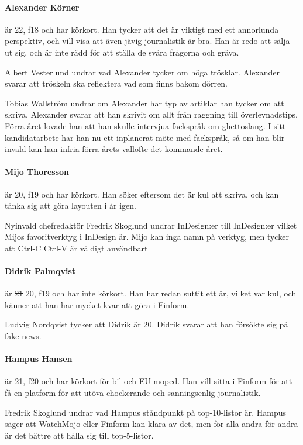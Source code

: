 \documentclass[hidelinks]{sektionsmote}
\begin{document}
\paragraph{Alexander Körner} är 22, f18 och har körkort.
Han tycker att det är viktigt med ett annorlunda perspektiv, och vill visa att även jävig journalistik är bra.
Han är redo att sälja ut sig, och är inte rädd för att ställa de svåra frågorna och gräva.

Albert Vesterlund undrar vad Alexander tycker om höga trösklar.
Alexander svarar att tröskeln ska reflektera vad som finns bakom dörren.

Tobias Wallström undrar om Alexander har typ av artiklar han tycker om att skriva.
Alexander svarar att han skrivit om allt från raggning till överlevnadstips.
Förra året lovade han att han skulle intervjua fackspråk om ghettoslang.
I sitt kandidatarbete har han nu ett inplanerat möte med fackspråk, så om han blir invald kan han infria förra årets vallöfte det kommande året.

\paragraph{Mijo Thoresson} är 20, f19 och har körkort.
Han söker eftersom det är kul att skriva, och kan tänka sig att göra layouten i år igen.

Nyinvald chefredaktör Fredrik Skoglund undrar InDesign:er till InDesign:er vilket Mijos favoritverktyg i InDesign är.
Mijo kan inga namn på verktyg, men tycker att Ctrl-C Ctrl-V är väldigt användbart

\paragraph{Didrik Palmqvist} är \st{21} 20, f19 och har inte körkort.
Han har redan suttit ett år, vilket var kul, och känner att han har mycket kvar att göra i Finform.

Ludvig Nordqvist tycker att Didrik är 20.
Didrik svarar att han försökte sig på fake news.

\paragraph{Hampus Hansen} är 21, f20 och har körkort för bil och EU-moped.
Han vill sitta i Finform för att få en platform för att utöva chockerande och sanningsenlig journalistik.

Fredrik Skoglund undrar vad Hampus ståndpunkt på top-10-listor är.
Hampus säger att WatchMojo eller Finform kan klara av det, men för alla andra för andra är det bättre att hålla sig till top-5-listor.
\end{document}
